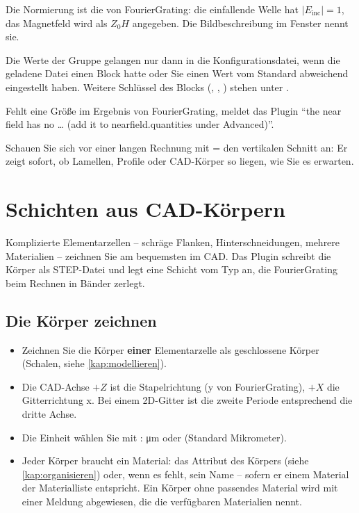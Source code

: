 Die Normierung ist die von FourierGrating: die einfallende Welle hat $|E_\text{inc}| = 1$, das
Magnetfeld wird als $Z_0 H$ angegeben. Die Bildbeschreibung im Fenster  nennt sie.

\begin{hinweis}
Die Werte der Gruppe  gelangen nur dann in die Konfigurationsdatei, wenn die geladene
Datei einen Block  hatte oder Sie einen Wert vom Standard abweichend eingestellt
haben. Weitere Schlüssel des Blocks (, , ) stehen
unter .
\end{hinweis}

Fehlt eine Größe im Ergebnis von FourierGrating, meldet das Plugin \enquote{the near field has no
\dots{} (add it to nearfield.quantities under Advanced)}.

\begin{tipp}
Schauen Sie sich vor einer langen Rechnung mit  =  den vertikalen Schnitt
an: Er zeigt sofort, ob Lamellen, Profile oder CAD-Körper so liegen, wie Sie es erwarten.
\end{tipp}

\section{Schichten aus CAD-Körpern}\label{sec:fg-cad}

Komplizierte Elementarzellen -- schräge Flanken, Hinterschneidungen, mehrere Materialien --
zeichnen Sie am bequemsten im CAD. Das Plugin schreibt die Körper als STEP-Datei und legt eine
Schicht vom Typ  an, die FourierGrating beim Rechnen in Bänder zerlegt.

\subsection{Die Körper zeichnen}

\begin{itemize}
  \item Zeichnen Sie die Körper \textbf{einer} Elementarzelle als geschlossene Körper (Schalen,
    siehe \autoref{kap:modellieren}).
  \item Die CAD-Achse $+Z$ ist die Stapelrichtung (y von FourierGrating), $+X$ die Gitterrichtung
    x. Bei einem 2D-Gitter ist die zweite Periode entsprechend die dritte Achse.
  \item Die Einheit wählen Sie mit : \si{\micro\metre} oder 
    (Standard Mikrometer).
  \item Jeder Körper braucht ein Material: das Attribut  des Körpers (siehe
    \autoref{kap:organisieren}) oder, wenn es fehlt, sein Name -- sofern er einem Material der
    Materialliste entspricht. Ein Körper ohne passendes Material wird mit einer Meldung abgewiesen,
    die die verfügbaren Materialien nennt.
\end{itemize}

